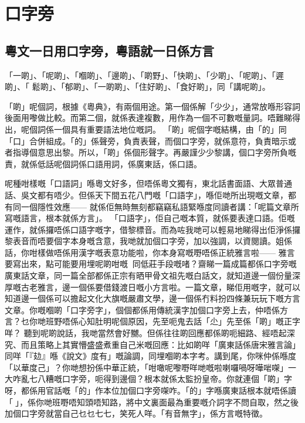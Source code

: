 \chapter{口字旁}

\section{粵文一日用口字旁，粵語就一日係方言}

「一啲」、「呢啲」、「嗰啲」、「邊啲」、「啲野」、「快啲」、「少啲」、「呢啲」、「遲啲」、「 鬆啲」、「郁啲」、「一啲啲」、「住好啲」、「食好啲」，同「講呢啲」。

「啲」呢個詞，根據《粵典》，有兩個用途。第一個係解「少少」，通常放喺形容詞後面用嚟做比較。而第二個，就係表達複數，用作為一個不可數嘅量詞。唔難睇得出，呢個詞係一個具有重要語法地位嘅詞。
「啲」呢個字嘅結構，由「的」同「口」合併組成。「的」係聲旁，負責表聲，而個口字旁，就係意符，負責暗示或者指導個意思出黎。所以，「啲」係個形聲字。再嚴謹少少黎講，個口字旁所負嘅責，就係低話呢個詞係口語用詞，係廣東話，係口語。

呢種咁樣嘅「口語詞」喺粵文好多，但唔係粵文獨有，東北話書面語、大眾普通話、吳文都有唔少。但係天下間五花八門嘅「口語字」，喺佢哋所出現嘅文章，都有同一個隱性效應—— 就係佢無時無刻都竊竊私語緊喺度同讀者講：「呢篇文章所寫嘅語言，根本就係方言」。
「口語字」，佢自己嘅本質，就係要表達口語。佢嘅運作，就係攞唔係口語字嘅字，借黎標音。而為咗我哋可以輕易地睇得出佢淨係攞黎表音而唔要個字本身嘅含意，我哋就加個口字旁，加以強調，以資閱讀。姐係話，你咁樣做唔係用漢字嘅表意功能啦，你本身寫嘅嘢唔係正統雅言啦—— 雅言要寫出來，點可能要用埋呢啲咁嘅同低莊手段嘅啫？齋睇一篇成篇都係口字旁嘅廣東話文章，同一篇全部都係正宗有晒甲骨文祖先嘅白話文，就知道邊一個份量深厚嘅古老雅言，邊一個係要借錢渡日嘅小方言啦。一篇文章，睇佢用嘅字，就可以知道邊一個係可以擔起文化大旗嘅嚴肅文學，邊一個係冇料扮四條兼玩玩下嘅方言文章。你嘅嗰啲「口字旁字」，個個都係用傳統漢字加個口字旁上去，仲唔係方言？乜你哋班野唔係心知肚明呢個原因，先至呃鬼去話「尐」先至係「啲」嘅正字咩？
聽到呢啲說話，我哋當然會好嬲。但係往往啲回應都係啲呃細路、經唔起深究、而且策略上其實懵盛盛煮重自己米嘅回應：比如啲咩「廣東話係唐宋雅言論」同咩「『攰』喺《說文》度有」嘅論調，同埋嗰啲本字考。講到尾，你咪仲係喺度「以華度己」？你哋想扮係中華正統，「咁噉呢嚟嘢咩哋嘅啦喇囉喎呀嘩啱㗎」一大咋亂七八糟嘅口字旁，呃得到邊個？根本就係太監扮皇帝。你就連個「啲」字呀，都係用官話嘅「的」作本位加個口字旁㗎咋。「的」字喺廣東話根本就唔係讀「󰦦」，係你哋班嘢唔知頭唔知路，將中文裏面最為重要嘅介詞字不問自取，然之後加個口字旁就當自己乜乜七七，笑死人咩。「有音無字」，係方言嘅特徵。

